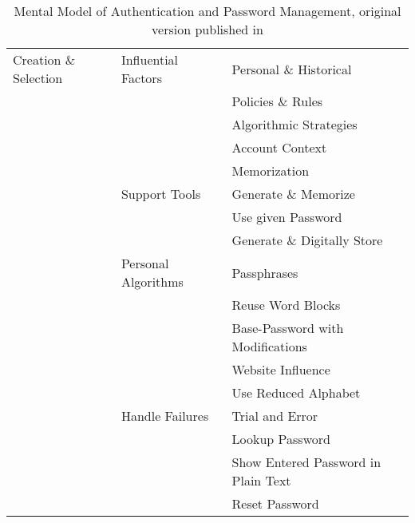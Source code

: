 \begin{table}[htpb]
\begin{threeparttable}
\begin{tabular} {l|l|l}
Creation \& Selection
		& Influential Factors & Personal \& Historical \\ 
		& & Policies \& Rules \\
		& & Algorithmic Strategies \\
		& & Account Context \\
		& & Memorization \\ \cline{2-3}
		& Support Tools & Generate \& Memorize \\
		& & Use given Password \\
		& & Generate \& Digitally Store \\ \cline{2-3}
		& Personal Algorithms & Passphrases \\
		& & Reuse Word Blocks \\
		& & Base-Password with Modifications \\
		& & Website Influence \\
		& & Use Reduced Alphabet \\\cline{2-3}
		 & Handle Failures & Trial and Error \\ 
		& & Lookup Password \\
		& & Show Entered Password in Plain Text\\
		& & Reset Password \\ \hline
\end{tabular}
\end{threeparttable}
\caption{\label{tab:mm_pwm:mental-model-table}
	Mental Model of Authentication and Password Management, original version published in \cite{Prinz2017Thesis}}
\end{table}